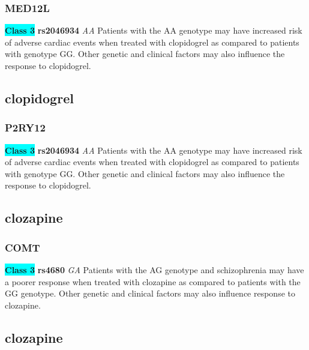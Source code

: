 \documentclass{book}
\begin{document}
\subsubsection{ MED12L }

\begin{center}
\textbf{\colorbox{cyan} {Class 3}} \textbf{ rs2046934 } \textit{ AA }
Patients with the AA genotype may have increased risk of adverse cardiac events when treated with clopidogrel as compared to patients with genotype GG. Other genetic and clinical factors may also influence the response to clopidogrel.


\end{center}\subsection{ clopidogrel }


\subsubsection{ P2RY12 }

\begin{center}
\textbf{\colorbox{cyan} {Class 3}} \textbf{ rs2046934 } \textit{ AA }
Patients with the AA genotype may have increased risk of adverse cardiac events when treated with clopidogrel as compared to patients with genotype GG. Other genetic and clinical factors may also influence the response to clopidogrel.


\end{center}\subsection{ clozapine }


\subsubsection{ COMT }

\begin{center}
\textbf{\colorbox{cyan} {Class 3}} \textbf{ rs4680 } \textit{ GA }
Patients with the AG genotype and schizophrenia may have a poorer response when treated with clozapine as compared to patients with the GG genotype. Other genetic and clinical factors may also influence response to clozapine.


\end{center}\subsection{ clozapine }
\end{document}
